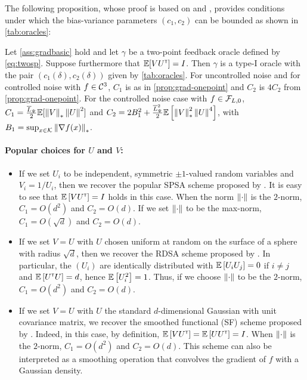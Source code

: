 The following proposition, whose proof is based on \citep[Lemma~1]{spall1992multivariate} and \citep[Lemma~1]{duchi2015optimal}, provides conditions under which the bias-variance parameters $(c_1,c_2)$ can be bounded as shown in \cref{tab:oracles}:
\begin{proposition}
\label{prop:grad-spsa}
Let \cref{ass:gradbasic} hold and let $\gamma$  be a two-point feedback oracle defined by \eqref{eq:twosp}.
Suppose furthermore that $\mathbb{E}[V U^\mathsf{\scriptscriptstyle T}] = I$.
Then $\gamma$ is a type-I oracle with the pair $(c_1(\delta),c_2(\delta))$ 
given by \cref{tab:oracles}. For uncontrolled noise and for controlled noise with $f\in\mathcal{C}^3$, $C_1$ is as in \cref{prop:grad-onepoint} and $C_2$ is $4 C_2$ from \cref{prop:grad-onepoint}. For the controlled noise case with $f \in \mathcal{F}_{L,0}$,
$C_1 = \frac{\overline{L}_{\Psi}}{2} \mathbb{E}[ \left\|V\right\|_* \left\|U\right\|^2]$  
and
$C_2 =  2 B_1^2  + \frac{ \overline{L}_{\Psi}^2}{2}\mathbb{E}\left[ \left\|V\right\|_*^2 \left\|U\right\|^4 \right]$, with $B_1 = \sup_{x\in \mathcal{K}} \left\|\nabla f(x)\right\|_*$.
\end{proposition}

\paragraph{Popular choices for $U$ and $V$:}
\begin{itemize}
 \item If we set $U_i$ to be independent, symmetric $\pm 1$-valued random variables and $V_i = 1/U_i$, then we recover the popular SPSA scheme proposed by \citet{spall1992multivariate}.
It is easy to see that $\mathbb{E}\left[  V U^\mathsf{\scriptscriptstyle T} \right] = I$ holds in this case.
 When the norm $\left\|\cdot\right\|$ is the $2$-norm, $C_1 = O(d^2)$ and $C_2 = O(d)$. If we set $\left\|\cdot\right\|$ to be the max-norm, $C_1 = O(\sqrt{d})$ and $C_2 = O(d)$.
 \item If we set $V=U$ with $U$ chosen uniform at random on the surface of a sphere with radius $\sqrt{d}$,
 then we recover the RDSA scheme proposed by  \citet[pp.~58--60]{kushcla}.
 In particular, the $(U_i)$ are identically distributed with $\mathbb{E}\left[ U_i U_j \right] = 0$ if $i\ne j$ and $\mathbb{E}\left[ U^\mathsf{\scriptscriptstyle T} U \right] = d$, hence $\mathbb{E}\left[U_i^2\right] = 1$. Thus, if we choose $\left\|\cdot\right\|$ to be the $2$-norm, $C_1 = O( d^2 )$ and $C_2 = O(d)$.
 \item If we set $V=U$ with $U$ the standard $d$-dimensional Gaussian with unit covariance matrix, we recover the smoothed functional (SF) scheme proposed by \citet{katkul}.
Indeed, in this case, by definition, $\mathbb{E}\left[VU^\mathsf{\scriptscriptstyle T}\right] = \mathbb{E}\left[U U^\mathsf{\scriptscriptstyle T} \right] = I$.
When $\left\|\cdot\right\|$ is the $2$-norm, $C_1 = O(d^2)$
 and $C_2 = O( d)$.
 This scheme can also be interpreted as a smoothing operation that  convolves the gradient of  $f$ with a Gaussian density.
\end{itemize}


